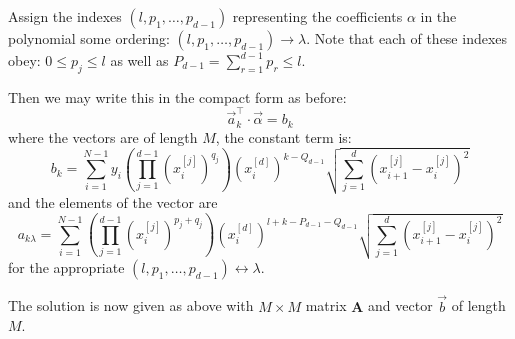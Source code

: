 \documentclass[11pt]{article}
\newcommand{\xdim}[1]{x^{[#1]}}
\begin{document}
Assign the indexes $(l,p_1,\dots,p_{d-1})$ representing the coefficients $\alpha$ in the polynomial some ordering: $(l,p_1,\dots,p_{d-1}) \rightarrow \lambda$. Note that each of these indexes obey: $0 \leq p_j \leq l$ as well as $P_{d-1} = \sum_{r=1}^{d-1} p_r \leq l$.

Then we may write this in the compact form as before:
\begin{equation}
\vec{a}_k^\intercal \cdot \vec{\alpha} = b_k
\end{equation}
where the vectors are of length $M$, the constant term is:
\begin{equation}
b_k = 
\sum_{i=1}^{N-1} 
y_i 
\left ( \prod_{j=1}^{d-1} (\xdim{j}_i)^{q_j} \right ) (\xdim{d}_i)^{k - Q_{d-1}} 
\sqrt{ \sum_{j=1}^d ( \xdim{j}_{i+1} - \xdim{j}_i )^2 }
\end{equation}
and the elements of the vector are
\begin{equation}
a_{k\lambda} = \sum_{i=1}^{N-1} 
\left ( \prod_{j=1}^{d-1} (\xdim{j}_i)^{p_j + q_j} \right ) 
(\xdim{d}_i)^{l + k - P_{d-1} - Q_{d-1}} 
\sqrt{ \sum_{j=1}^d ( \xdim{j}_{i+1} - \xdim{j}_i )^2 }
\end{equation}
for the appropriate $(l,p_1,\dots,p_{d-1}) \leftrightarrow \lambda$.

The solution is now given as above with $M \times M$ matrix $\boldsymbol{A}$ and vector $\vec{b}$ of length $M$.
\end{document}
